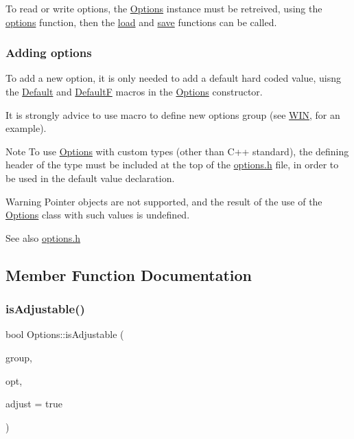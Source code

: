 To read or write options, the \hyperlink{struct_options}{Options} instance must be retreived, using the \hyperlink{struct_options_aa3dd7609fbc5d54af65992632bff842a}{options} function, then the \hyperlink{struct_options_ada32d485296bd6ba73a1d95bd6260c1a}{load} and \hyperlink{struct_options_ad20146ff9544f6229bb1696ea5bf643d}{save} functions can be called.

\subsubsection*{Adding options}

To add a new option, it is only needed to add a default hard coded value, uisng the \hyperlink{options_8h_a37c44b1e71afed084dbe855181c444e2}{Default} and \hyperlink{options_8h_a39f3ee28f306ee663a9985433ef2d01c}{DefaultF} macros in the \hyperlink{struct_options}{Options} constructor.

It is strongly advice to use macro to define new options group (see \hyperlink{options_8h_a43105771f16e2da3078149f0de528e9b}{W\+IN}, for an example).

\begin{DoxyNote}{Note}
To use \hyperlink{struct_options}{Options} with custom types (other than {\ttfamily C++} standard), the defining header of the type must be included at the top of the \hyperlink{options_8h}{options.\+h} file, in order to be used in the default value declaration.
\end{DoxyNote}
\begin{DoxyWarning}{Warning}
Pointer objects are not supported, and the result of the use of the \hyperlink{struct_options}{Options} class with such values is undefined.
\end{DoxyWarning}
\begin{DoxySeeAlso}{See also}
\hyperlink{options_8h}{options.\+h} 
\end{DoxySeeAlso}


\subsection{Member Function Documentation}
\hypertarget{struct_options_a1188a188db82d70c96af44679d2cbbf9}{}\label{struct_options_a1188a188db82d70c96af44679d2cbbf9} 
\subsubsection{\texorpdfstring{is\+Adjustable()}{isAdjustable()}}
{\footnotesize\ttfamily bool Options\+::is\+Adjustable (\begin{DoxyParamCaption}\item[{Q\+String}]{group,  }\item[{Q\+String}]{opt,  }\item[{bool}]{adjust = {\ttfamily true} }\end{DoxyParamCaption})}

